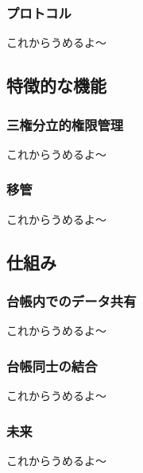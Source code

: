 \documentclass[a4j]{jarticle}
\begin{document}
\begin{multicols}{2}
\subsubsection{プロトコル}
これからうめるよ〜


\subsection{特徴的な機能}

\subsubsection{三権分立的権限管理}
これからうめるよ〜

\subsubsection{移管}
これからうめるよ〜

\subsection{仕組み}

\subsubsection{台帳内でのデータ共有}
これからうめるよ〜

\subsubsection{台帳同士の結合}
これからうめるよ〜

\subsubsection{未来}
これからうめるよ〜

\end{multicols}
\end{document}
